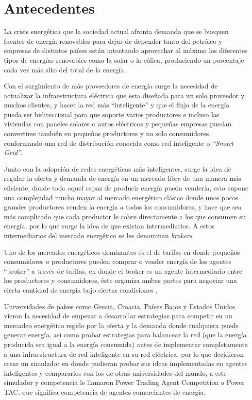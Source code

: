 \section{Antecedentes}

La crisis energética que la sociedad actual afronta demanda que se busquen fuentes de energía renovables para dejar de depender tanto del petróleo y empresas de distintos países están intentando aprovechar al máximo los diferentes tipos de energías renovables como la solar o la eólica, produciendo un porcentaje cada vez más alto del total de la  energía. 

Con el surgimiento de más proveedores de energía surge la necesidad de actualizar la infraestructura eléctrica que esta diseñada para un solo proveedor y muchos clientes, y hacer la red más ``inteligente'' y que el flujo de la energía pueda ser bidireccional para que soporte varios productores e incluso las viviendas con paneles solares o autos eléctricos y pequeñas empresas puedan convertirse también en pequeños productores y no solo consumidores, conformando una red de distribución conocida como red inteligente o \textit{``Smart Grid''}.

Junto con la adopción de redes energéticas más inteligentes, surge la idea de regular la oferta y demanda de energía en un mercado libre de una manera más eficiente, donde todo aquel capaz de producir energía pueda venderla, esto supone una complejidad mucho mayor al mercado energético clásico donde unos pocos grandes productores venden la energía a todos los consumidores, y hace que sea más complicado que cada productor le cobre directamente a los que consumen su energía, por lo que surge la idea de que existan intermediarios. A estos intermediarios del mercado energético se les denominan \textit{brokers}.

Uno de los mercados energéticos dominantes es el de tarifas en donde pequeños consumidores o productores pueden comprar o vender energía de los agentes ``broker'' a través de tarifas, en donde el broker es un agente intermediario entre los productores y consumidores, éste organiza ambas partes para negociar una cierta cantidad de energía bajo ciertas condiciones \cite{MPAlonsoAYRGonzalezDesarrolloDeTec}.

Universidades de países como Grecia, Croacia, Países Bajos y Estados Unidos vieron la necesidad de empezar a desarrollar estrategias para competir en un mercadeo energético regido por la oferta y la demanda donde cualquiera puede generar energía, asi como probar estrategias para balancear la red (que la energía producida sea igual a la energía consumida) antes de implementar completamente a una infraestructura de red inteligente en su red eléctrica, por lo que decidieron crear un simulador en donde pudieran probar sus ideas implementadas en agentes inteligentes y compararlos con los de otras universidades del mundo, a este simulador y competencia le llamaron Power Trading Agent Competition o Power TAC, que significa competencia de agentes comerciantes de energía.

